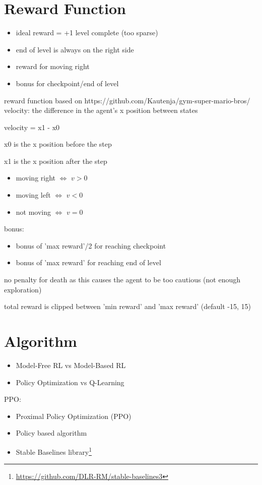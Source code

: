 \documentclass{article}
\begin{document}
    \section{Reward Function}
    \begin{itemize}
        \item ideal reward = +1 level complete (too sparse)
        \item end of level is always on the right side
        \item reward for moving right
        \item bonus for checkpoint/end of level
    \end{itemize}
    reward function based on https://github.com/Kautenja/gym-super-mario-bros/
    velocity: the difference in the agent's x position between states

    velocity = x1 - x0

    x0 is the x position before the step

    x1 is the x position after the step

    \begin{itemize}
        \item moving right $\Leftrightarrow$ $v > 0$
        \item moving left $\Leftrightarrow$ $v < 0$
        \item not moving $\Leftrightarrow$ $v = 0$
    \end{itemize}
    bonus:
    \begin{itemize}
        \item bonus of 'max reward'/2 for reaching checkpoint
        \item bonus of 'max reward' for reaching end of level
    \end{itemize}
    no penalty for death as this causes the agent to be too cautious (not enough exploration)

    total reward is clipped between 'min reward' and 'max reward' (default -15, 15)

    \section{Algorithm}
    \begin{itemize}
        \item Model-Free RL vs Model-Based RL
        \item Policy Optimization vs Q-Learning
    \end{itemize}
    PPO:
    \begin{itemize}
        \item Proximal Policy Optimization (PPO)
        \item Policy based algorithm
        \item Stable Baselines library\footnote{\url{https://github.com/DLR-RM/stable-baselines3}}
    \end{itemize}
\end{document}

